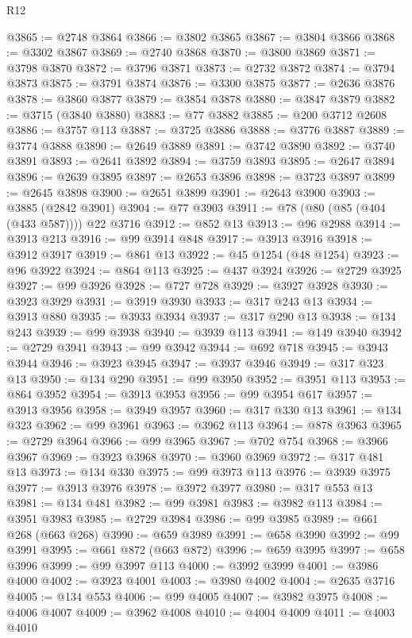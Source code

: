\begin{lexlean}{R12}
\begin{coremodule}
@3865 := @2748 @3864
@3866 := @3802 @3865
@3867 := @3804 @3866
@3868 := @3302 @3867
@3869 := @2740 @3868
@3870 := @3800 @3869
@3871 := @3798 @3870
@3872 := @3796 @3871
@3873 := @2732 @3872
@3874 := @3794 @3873
@3875 := @3791 @3874
@3876 := @3300 @3875
@3877 := @2636 @3876
@3878 := @3860 @3877
@3879 := @3854 @3878
@3880 := @3847 @3879
@3882 := @3715 (@3840 @3880)
@3883 := @77 @3882
@3885 := @200 @3712 @2608
@3886 := @3757 @113
@3887 := @3725 @3886
@3888 := @3776 @3887
@3889 := @3774 @3888
@3890 := @2649 @3889
@3891 := @3742 @3890
@3892 := @3740 @3891
@3893 := @2641 @3892
@3894 := @3759 @3893
@3895 := @2647 @3894
@3896 := @2639 @3895
@3897 := @2653 @3896
@3898 := @3723 @3897
@3899 := @2645 @3898
@3900 := @2651 @3899
@3901 := @2643 @3900
@3903 := @3885 (@2842 @3901)
@3904 := @77 @3903
@3911 := @78 (@80 (@85 (@404 (@433 @587)))) @22 @3716
@3912 := @852 @13
@3913 := @96 @2988
@3914 := @3913 @213
@3916 := @99 @3914 @848
@3917 := @3913 @3916
@3918 := @3912 @3917
@3919 := @861 @13
@3922 := @45 @1254 (@48 @1254)
@3923 := @96 @3922
@3924 := @864 @113
@3925 := @437 @3924
@3926 := @2729 @3925
@3927 := @99 @3926
@3928 := @727 @728
@3929 := @3927 @3928
@3930 := @3923 @3929
@3931 := @3919 @3930
@3933 := @317 @243 @13
@3934 := @3913 @880
@3935 := @3933 @3934
@3937 := @317 @290 @13
@3938 := @134 @243
@3939 := @99 @3938
@3940 := @3939 @113
@3941 := @149 @3940
@3942 := @2729 @3941
@3943 := @99 @3942
@3944 := @692 @718
@3945 := @3943 @3944
@3946 := @3923 @3945
@3947 := @3937 @3946
@3949 := @317 @323 @13
@3950 := @134 @290
@3951 := @99 @3950
@3952 := @3951 @113
@3953 := @864 @3952
@3954 := @3913 @3953
@3956 := @99 @3954 @617
@3957 := @3913 @3956
@3958 := @3949 @3957
@3960 := @317 @330 @13
@3961 := @134 @323
@3962 := @99 @3961
@3963 := @3962 @113
@3964 := @878 @3963
@3965 := @2729 @3964
@3966 := @99 @3965
@3967 := @702 @754
@3968 := @3966 @3967
@3969 := @3923 @3968
@3970 := @3960 @3969
@3972 := @317 @481 @13
@3973 := @134 @330
@3975 := @99 @3973 @113
@3976 := @3939 @3975
@3977 := @3913 @3976
@3978 := @3972 @3977
@3980 := @317 @553 @13
@3981 := @134 @481
@3982 := @99 @3981
@3983 := @3982 @113
@3984 := @3951 @3983
@3985 := @2729 @3984
@3986 := @99 @3985
@3989 := @661 @268 (@663 @268)
@3990 := @659 @3989
@3991 := @658 @3990
@3992 := @99 @3991
@3995 := @661 @872 (@663 @872)
@3996 := @659 @3995
@3997 := @658 @3996
@3999 := @99 @3997 @113
@4000 := @3992 @3999
@4001 := @3986 @4000
@4002 := @3923 @4001
@4003 := @3980 @4002
@4004 := @2635 @3716
@4005 := @134 @553
@4006 := @99 @4005
@4007 := @3982 @3975
@4008 := @4006 @4007
@4009 := @3962 @4008
@4010 := @4004 @4009
@4011 := @4003 @4010

\end{coremodule}
\end{lexlean}
